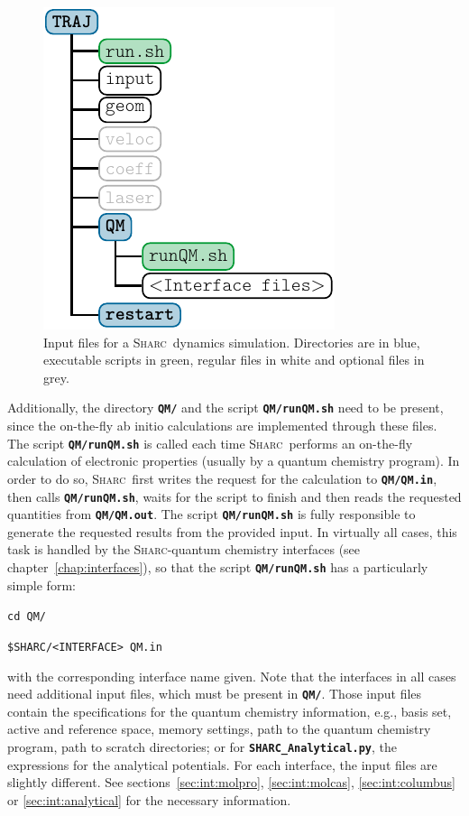 \documentclass[a4paper,11pt,DIV=15,openany,twoside=false]{scrbook}
\newcommand{\sharc}{\textsc{Sharc}}
\newcommand{\ttt}[1]{\textbf{\texttt{#1}}}
\newenvironment{example}{
  \vspace{0mm}
  \definecolor{shadecolor}{HTML}{E4F4FF}
  \begin{shaded}
}{
  \end{shaded}
}
\begin{document}
\begin{figure}[h!]
  \centering
  \includegraphics[scale=1]{img/dir_traj/dir_traj.pdf}
  \caption{Input files for a \sharc\ dynamics simulation. Directories are in blue, executable scripts in green, regular files in white and optional files in grey.}
  \label{fig:dir_traj}
\end{figure}

Additionally, the directory \ttt{QM/} and the script \ttt{QM/runQM.sh} need to be present, since the on-the-fly ab initio calculations are implemented through these files. The script \ttt{QM/runQM.sh} is called each time \sharc\ performs an on-the-fly calculation of electronic properties (usually by a quantum chemistry program). In order to do so, \sharc\ first writes the request for the calculation to \ttt{QM/QM.in}, then calls \ttt{QM/runQM.sh}, waits for the script to finish and then reads the requested quantities from \ttt{QM/QM.out}. The script \ttt{QM/runQM.sh} is fully responsible to generate the requested results from the provided input. 
In virtually all cases, this task is handled by the \sharc-quantum chemistry interfaces (see chapter~\ref{chap:interfaces}), so that the script \ttt{QM/runQM.sh} has a particularly simple form:
\begin{example}
\verb|cd QM/|

\verb|$SHARC/<INTERFACE> QM.in |
\end{example}
with the corresponding interface name given. Note that the interfaces in all cases need additional input files, which must be present in \ttt{QM/}. Those input files contain the specifications for the quantum chemistry information, e.g., basis set, active and reference space, memory settings, path to the quantum chemistry program, path to scratch directories; or for \ttt{SHARC\_Analytical.py}, the expressions for the analytical potentials. For each interface, the input files are slightly different. See sections~\ref{sec:int:molpro}, \ref{sec:int:molcas}, \ref{sec:int:columbus} or \ref{sec:int:analytical} for the necessary information.
\end{document}
